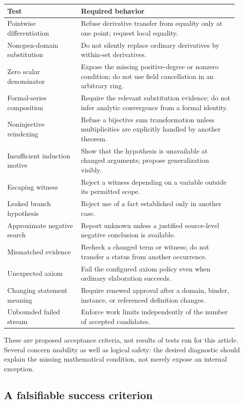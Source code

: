 \documentclass[11pt,letterpaper]{article}
\theoremstyle{remark}
\begin{document}
\begin{longtable}{@{}p{0.30\linewidth}p{0.64\linewidth}@{}}
\toprule
Test & Required behavior \\
\midrule
\endhead
Pointwise differentiation & Refuse derivative transfer from equality only at one point; request local equality. \\
Nonopen-domain substitution & Do not silently replace ordinary derivatives by within-set derivatives. \\
Zero scalar denominator & Expose the missing positive-degree or nonzero condition; do not use field cancellation in an arbitrary ring. \\
Formal-series composition & Require the relevant substitution evidence; do not infer analytic convergence from a formal identity. \\
Noninjective reindexing & Refuse a bijective sum transformation unless multiplicities are explicitly handled by another theorem. \\
Insufficient induction motive & Show that the hypothesis is unavailable at changed arguments; propose generalization visibly. \\
Escaping witness & Reject a witness depending on a variable outside its permitted scope. \\
Leaked branch hypothesis & Reject use of a fact established only in another case. \\
Approximate negative search & Report unknown unless a justified source-level negative conclusion is available. \\
Mismatched evidence & Recheck a changed term or witness; do not transfer a status from another occurrence. \\
Unexpected axiom & Fail the configured axiom policy even when ordinary elaboration succeeds. \\
Changing statement meaning & Require renewed approval after a domain, binder, instance, or referenced definition changes. \\
Unbounded failed stream & Enforce work limits independently of the number of accepted candidates. \\
\bottomrule
\end{longtable}
These are proposed acceptance criteria, not results of tests run for this article. Several concern usability as well as logical safety: the desired diagnostic should explain the missing mathematical condition, not merely expose an internal exception.

\subsection{A falsifiable success criterion}
\end{document}
